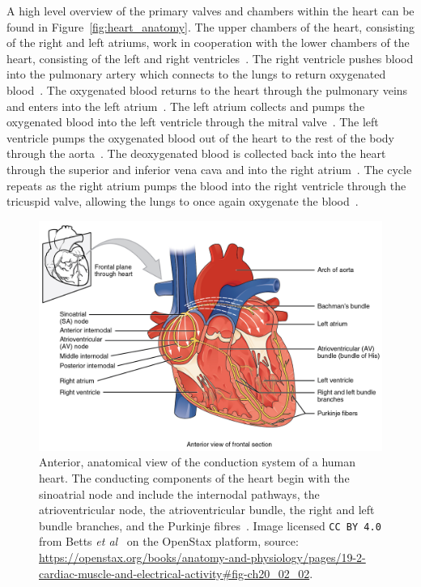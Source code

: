 \documentclass[\main/thesis.tex]{subfiles}
\begin{document}
A high level overview of the primary valves and chambers within the heart can be found in Figure~\ref{fig:heart_anatomy}.
The upper chambers of the heart, consisting of the right and left atriums, work in cooperation with the lower chambers of the heart, consisting of the left and right ventricles~\cite{anderson_wilcoxs_2013}.
The right ventricle pushes blood into the pulmonary artery which connects to the lungs to return oxygenated blood~\cite{anderson_wilcoxs_2013}.
The oxygenated blood returns to the heart through the pulmonary veins and enters into the left atrium~\cite{anderson_wilcoxs_2013}.
The left atrium collects and pumps the oxygenated blood into the left ventricle through the mitral valve~\cite{anderson_wilcoxs_2013}.
The left ventricle pumps the oxygenated blood out of the heart to the rest of the body through the aorta~\cite{anderson_wilcoxs_2013}.
The deoxygenated blood is collected back into the heart through the superior and inferior vena cava and into the right atrium~\cite{anderson_wilcoxs_2013}.
The cycle repeats as the right atrium pumps the blood into the right ventricle through the tricuspid valve, allowing the lungs to once again oxygenate the blood~\cite{anderson_wilcoxs_2013}.

\begin{figure}[ht]
    \centering
    \includegraphics[width=14cm]{figure/conduction-system-of-the-heart.jpeg}
    \caption[Anterior, anatomical view of the conduction system of a human heart.]{Anterior, anatomical view of the conduction system of a human heart. The conducting components of the heart begin with the sinoatrial node and include the internodal pathways, the atrioventricular node, the atrioventricular bundle, the right and left bundle branches, and the Purkinje fibres~\cite{betts-anatomy-and-physiology}.
    Image licensed \texttt{CC BY 4.0} from Betts \emph{et al}~\cite{betts-anatomy-and-physiology} on the OpenStax platform, source: \url{https://openstax.org/books/anatomy-and-physiology/pages/19-2-cardiac-muscle-and-electrical-activity\#fig-ch20_02_02}.}
    \label{fig:heart_conduction_system}
\end{figure}
\end{document}
